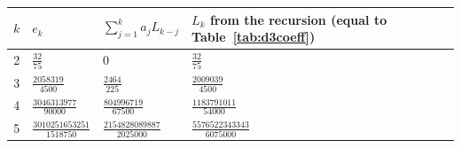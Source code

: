 \begin{tabular}{clll}\toprule
$k$ & $e_k$ & $\sum_{j=1}^{k}a_jL_{k-j}$ & $L_k$ from the recursion (equal to Table~\ref{tab:d3coeff}) \\\midrule
2 & $\frac{32}{75}$ & $0$ & $\frac{32}{75}$ \\
3 & $\frac{2058319}{4500}$ & $\frac{2464}{225}$ & $\frac{2009039}{4500}$ \\
4 & $\frac{3046313977}{90000}$ & $\frac{804996719}{67500}$ & $\frac{1183791011}{54000}$ \\
5 & $\frac{3010251653251}{1518750}$ & $\frac{2154828089887}{2025000}$ & $\frac{5576522343343}{6075000}$ \\
\bottomrule\end{tabular}
